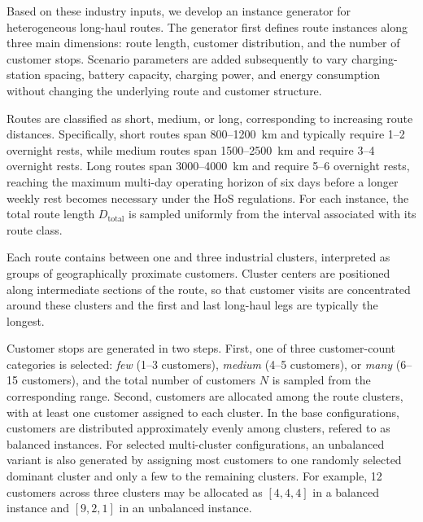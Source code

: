 \documentclass[3p,11pt,authoryear]{elsarticle}  %
\begin{document}
Based on these industry inputs, we develop an instance generator for heterogeneous long-haul routes. The generator first defines route instances along three main dimensions: route length, customer distribution, and the number of customer stops. %
Scenario parameters are added subsequently to vary charging-station spacing, battery capacity, charging power, and energy consumption without changing the underlying route and customer structure.


Routes are classified as {short}, {medium}, or {long}, corresponding to increasing route distances. Specifically, short routes span 800--1200~km and typically require 1--2 overnight rests, while medium routes span 1500--2500~km and require 3--4 overnight rests. Long routes span 3000--4000~km and require 5--6 overnight rests, reaching the maximum multi-day operating horizon of six days before a longer weekly rest becomes necessary under the HoS regulations. For each instance, the total route length \(D_{\text{total}}\) is sampled uniformly from the interval associated with its route class.

Each route contains between one and three industrial clusters, interpreted as groups of geographically proximate customers. Cluster centers are positioned along intermediate sections of the route, so that customer visits are concentrated around these clusters and the first and last long-haul legs are typically the longest. %


Customer stops are generated in two steps. First, one of three customer-count categories is selected: \textit{few} (1--3 customers), \textit{medium} (4--5 customers), or \textit{many} (6--15 customers), and the total number of customers \(N\) is sampled from the corresponding range. Second, customers are allocated among the route clusters, with at least one customer assigned to each cluster. In the base configurations, customers are distributed approximately evenly among clusters, refered to as balanced instances. For selected multi-cluster configurations, an unbalanced variant is also generated by assigning most customers to one randomly selected dominant cluster and only a few to the remaining clusters. For example, 12 customers across three clusters may be allocated as \([4,4,4]\) in a balanced instance and \([9,2,1]\) in an unbalanced instance. %
\end{document}
